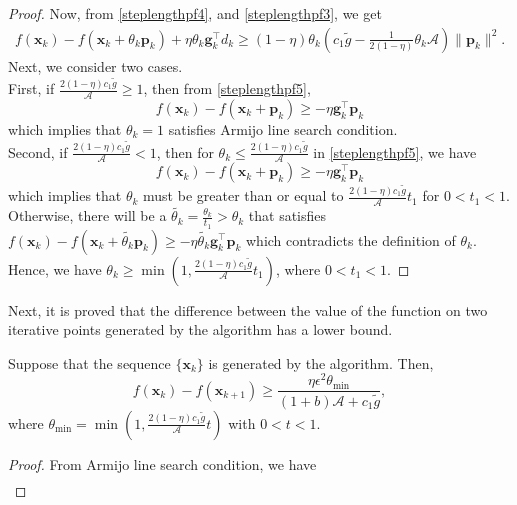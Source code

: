 \documentclass{elsarticle}
\numberwithin{equation}{section}
\begin{document}
{\begin{proof}
    Now, from  \eqref{steplengthpf4}, and \eqref{steplengthpf3}, we get 
    \begin{align}\label{steplengthpf5}
        f(\mathbf{x}_{k})-f(\mathbf{x}_{k}+\theta_{k}\mathbf{p}_{k})+\eta\theta_{k}\mathbf{g}^{\top}_{k}d_{k}\geq (1-\eta) \theta_{k} \left(c_1\tilde{g}-\frac{1}{2(1-\eta)}\theta_{k}\mathcal{A}\right)\lVert \mathbf{p}_{k}\rVert^{2}.
    \end{align}
Next, we consider two cases.\\
First, if $\frac{2(1-\eta)c_1\tilde{g}}{\mathcal{A}}\geq1$, then from \eqref{steplengthpf5}, 
\begin{equation*}
f(\mathbf{x}_{k})-f(\mathbf{x}_{k}+\mathbf{p}_k)\geq-\eta \mathbf{g}^{\top}_{k}\mathbf{p}_{k}
\end{equation*}
which implies that $\theta_{k}=1$ satisfies Armijo line search condition.\\
Second, if $\frac{2(1-\eta)c_1\tilde{g}}{\mathcal{A}}<1$, then for $\theta_{k}\leq \frac{2(1-\eta)c_1\tilde{g}}{\mathcal{A}}$ in \eqref{steplengthpf5}, we have 
\begin{equation}
    f(\mathbf{x}_{k})-f(\mathbf{x}_{k}+\mathbf{p}_k)\geq-\eta \mathbf{g}^{\top}_{k}\mathbf{p}_{k}
\end{equation}
which implies that $\theta_{k}$ must be greater than or equal to $\frac{2(1-\eta)c_1\tilde{g}}{\mathcal{A}}{t_1}$ for $0<t_1<1$. Otherwise, there will be a $\tilde{\theta_{k}}=\frac{\theta_{k}}{t_1}>\theta_{k}$ that 
satisfies 
$ f(\mathbf{x}_{k})-f(\mathbf{x}_{k}+\tilde{\theta_{k}}\mathbf{p}_k)\geq-\eta\tilde{\theta_{k}} \mathbf{g}^{\top}_{k}\mathbf{p}_{k}$ which contradicts the definition of $\theta_{k}$. Hence, we have $\theta_{k}\geq\min\left(1,\frac{2(1-\eta)c_1\tilde{g}}{\mathcal{A}}{t_1}\right)$, where  $0<t_1<1$. 
\end{proof}
Next, it is proved that the difference between the value of the function on two iterative points generated by the algorithm has a lower bound.
\begin{lemma}\label{differencelemma}
    Suppose that the sequence $\{\mathbf{x}_{k}\}$ is generated by the algorithm. Then,
\[
f(\mathbf{x}_{k})-f(\mathbf{x}_{k+1})\geq \frac{\eta\epsilon^{2}\theta_{\min}}{(1+b)\mathcal{A}+c_1\tilde{g}},
\]
where $\theta_{\min}= \min\left(1,\frac{2(1-\eta)c_1\tilde{g}}{\mathcal{A}}{t}\right)$ with $0<t<1$.
\end{lemma}
\begin{proof}
    From Armijo line search condition, we have 
    \begin{align}\label{differencelemmapf1}

\end{align}
\end{proof}}
\end{document}
